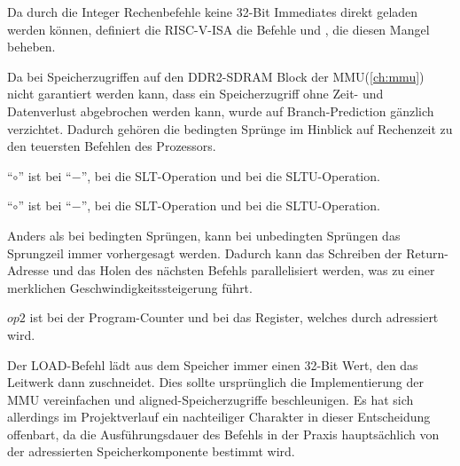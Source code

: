 
Da durch die Integer Rechenbefehle keine 32-Bit Immediates direkt geladen werden
k\"onnen, definiert die RISC-V-ISA die Befehle  und , die
diesen Mangel beheben.



Da bei Speicherzugriffen auf den DDR2-SDRAM Block der MMU(\ref{ch:mmu}) nicht
garantiert werden kann, dass ein Speicherzugriff ohne Zeit- und Datenverlust
abgebrochen werden kann, wurde auf Branch-Prediction g\"anzlich verzichtet.
Dadurch geh\"oren die bedingten Spr\"unge im Hinblick auf Rechenzeit zu den
teuersten Befehlen des Prozessors.

{``\(\circ\)'' ist bei  ``\(-\)'', bei  die SLT-Operation
und bei  die SLTU-Operation.
}

{``\(\circ\)'' ist bei  ``\(-\)'', bei  die SLT-Operation
und bei  die SLTU-Operation.
}

Anders als bei bedingten Spr\"ungen, kann bei unbedingten Spr\"ungen das
Sprungzeil immer vorhergesagt werden. Dadurch kann das Schreiben der
Return-Adresse und das Holen des n\"achsten Befehls parallelisiert werden, was
zu einer merklichen Geschwindigkeitssteigerung f\"uhrt.

{\(op2\) ist bei  der Program-Counter und bei  das
Register, welches durch  adressiert wird.
}

Der LOAD-Befehl l\"adt aus dem Speicher immer einen 32-Bit Wert, den das
Leitwerk dann zuschneidet. Dies sollte urspr\"unglich die Implementierung der
MMU vereinfachen und aligned-Speicherzugriffe beschleunigen. Es hat sich
allerdings im Projektverlauf ein nachteiliger Charakter in dieser Entscheidung offenbart, da die Ausf\"uhrungsdauer des Befehls in der Praxis
haupts\"achlich von der adressierten Speicherkomponente bestimmt wird.

